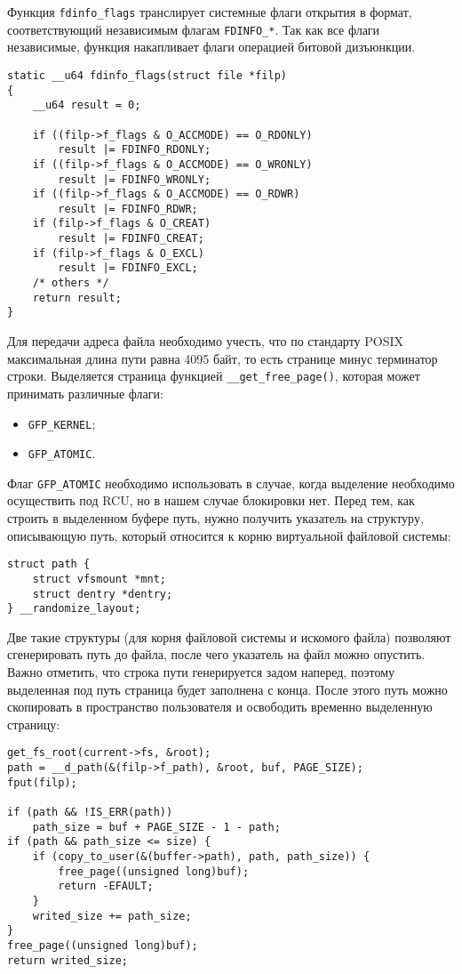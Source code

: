 Функция \texttt{fdinfo\_flags} транслирует системные флаги открытия в формат,
соответствующий независимым флагам \texttt{FDINFO\_*}. Так как все флаги
независимые, функция накапливает флаги операцией битовой дизъюнкции.
\medskip
\begin{lstlisting}[style=cstyle]
static __u64 fdinfo_flags(struct file *filp)
{
	__u64 result = 0;

	if ((filp->f_flags & O_ACCMODE) == O_RDONLY)
		result |= FDINFO_RDONLY;
	if ((filp->f_flags & O_ACCMODE) == O_WRONLY)
		result |= FDINFO_WRONLY;
	if ((filp->f_flags & O_ACCMODE) == O_RDWR)
		result |= FDINFO_RDWR;
	if (filp->f_flags & O_CREAT)
		result |= FDINFO_CREAT;
	if (filp->f_flags & O_EXCL)
		result |= FDINFO_EXCL;
	/* others */
	return result;
}
\end{lstlisting}
\medskip

Для передачи адреса файла необходимо учесть, что по стандарту POSIX максимальная
длина пути равна 4095 байт, то есть странице минус терминатор строки. Выделяется
страница функцией \texttt{\_\_get\_free\_page()}, которая может принимать
различные флаги:
\begin{itemize}
\item \texttt{GFP\_KERNEL};
\item \texttt{GFP\_ATOMIC}.
\end{itemize}

Флаг \texttt{GFP\_ATOMIC} необходимо использовать в случае, когда выделение
необходимо осуществить под RCU, но в нашем случае блокировки нет. Перед тем, как
строить в выделенном буфере путь, нужно получить указатель на структуру,
описывающую путь, который относится к корню виртуальной файловой системы:
\medskip
\begin{lstlisting}[style=cstyle]
struct path {
	struct vfsmount *mnt;
	struct dentry *dentry;
} __randomize_layout;
\end{lstlisting}
\medskip

Две такие структуры (для корня файловой системы и искомого файла) позволяют
сгенерировать путь до файла, после чего указатель на файл можно опустить. Важно
отметить, что строка пути генерируется задом наперед, поэтому выделенная под
путь страница будет заполнена с конца. После этого путь можно скопировать в
пространство пользователя и освободить временно выделенную страницу:
\medskip
\begin{lstlisting}[style=cstyle]
get_fs_root(current->fs, &root);
path = __d_path(&(filp->f_path), &root, buf, PAGE_SIZE);
fput(filp);

if (path && !IS_ERR(path))
	path_size = buf + PAGE_SIZE - 1 - path;
if (path && path_size <= size) {
	if (copy_to_user(&(buffer->path), path, path_size)) {
		free_page((unsigned long)buf);
		return -EFAULT;
	}
	writed_size += path_size;
}
free_page((unsigned long)buf);
return writed_size;
\end{lstlisting}
\medskip

